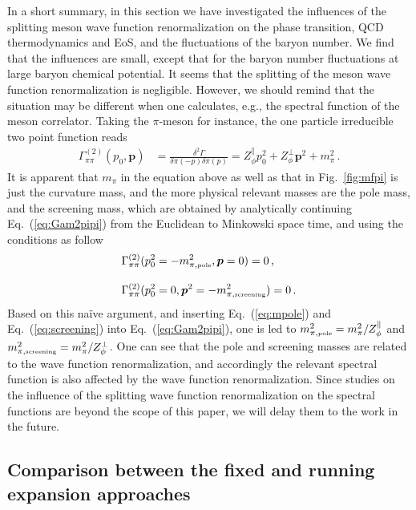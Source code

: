 \documentclass[%
reprint,
superscriptaddress,
showpacs,preprintnumbers,
 amsmath,amssymb,
 aps,
prd,
]{revtex4-1}
\def\Fig#1{Fig.~\ref{#1}} \def\Tab#1{Tab.~\ref{#1}}
\def\Eq#1{Eq.~(\ref{#1})}
\begin{document}
In a short summary,  in this section we have investigated the influences of the splitting meson wave function renormalization on the phase transition, QCD thermodynamics and EoS, and the fluctuations of the baryon number. We find that the influences are small, except that for the baryon number fluctuations at large baryon chemical potential. It seems that the splitting of the meson wave function renormalization is negligible. However, we should remind that the situation may be different when one calculates, e.g., the spectral function of the meson correlator. Taking the $\pi$-meson for instance, the one particle irreducible two point function reads
\begin{align}
  \Gamma^{(2)}_{\pi \pi}(p_0, \bm{p})&=\frac{\delta^2 \Gamma}{\delta \pi(-p) \delta \pi(p)}= Z_{\phi}^{\parallel} p_0^2+Z_{\phi}^{\perp}\bm{p}^2+m_\pi^2\,.\label{eq:Gam2pipi}
\end{align}
It is apparent that $m_\pi$ in the equation above as well as that in \Fig{fig:mfpi} is just the curvature mass, and the more physical relevant masses are the pole mass, and the screening mass, which are obtained by analytically continuing \Eq{eq:Gam2pipi} from the Euclidean to Minkowski space time, and using the conditions as follow
\begin{align}
  &\Gamma^{(2)}_{\pi \pi}(p_0^2=-m_{\pi,\text{\tiny{pole}}}^2, \bm{p}=0)=0\,, \label{eq:mpole}\\[2ex]
  &\Gamma^{(2)}_{\pi \pi}(p_0^2=0, \bm{p}^2=-m_{\pi,\text{\tiny{screening}}}^2)=0\,. \label{eq:screening}
\end{align}
Based on this na\"ive argument, and inserting \Eq{eq:mpole} and \Eq{eq:screening} into \Eq{eq:Gam2pipi}, one is led to $m_{\pi,\text{\tiny{pole}}}^2=m_\pi^2/Z_{\phi}^{\parallel}$ and $m_{\pi,\text{\tiny{screening}}}^2=m_\pi^2/Z_{\phi}^{\perp}$. One can see that the pole and screening masses are related to the wave function renormalization, and accordingly the relevant spectral function is also affected by the wave function renormalization. Since studies on the influence of the splitting wave function renormalization on the spectral functions are beyond the scope of this paper, we will delay them to the work in the future.

\subsection{Comparison between the fixed and running expansion approaches}
\label{sec:expansion}

\end{document}
